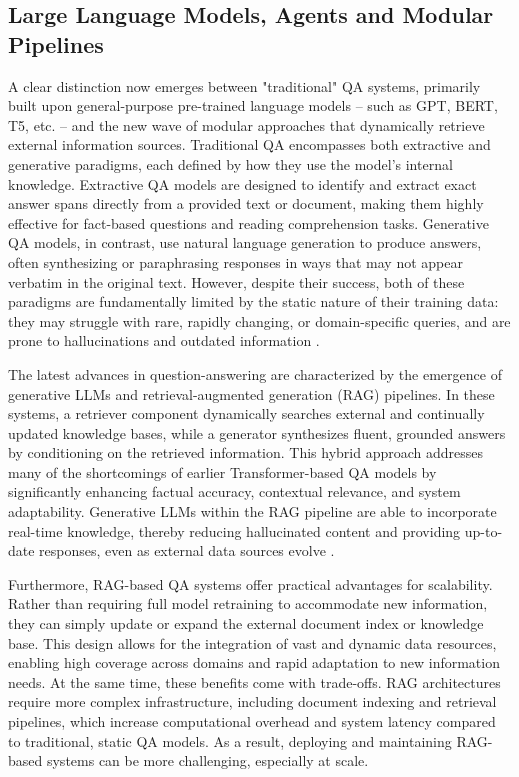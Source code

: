 \begin{spacing}{1.5}
\section{Large Language Models, Agents and Modular Pipelines}
A clear distinction now emerges between "traditional" QA systems, primarily built upon general-purpose pre-trained language models -- such as GPT, BERT, T5, etc. -- and the new wave of modular approaches that dynamically retrieve external information sources. Traditional QA encompasses both extractive and generative paradigms, each defined by how they use the model’s internal knowledge. Extractive QA models are designed to identify and extract exact answer spans directly from a provided text or document, making them highly effective for fact-based questions and reading comprehension tasks. Generative QA models, in contrast, use natural language generation to produce answers, often synthesizing or paraphrasing responses in ways that may not appear verbatim in the original text. However, despite their success, both of these paradigms are fundamentally limited by the static nature of their training data: they may struggle with rare, rapidly changing, or domain-specific queries, and are prone to hallucinations and outdated information \citep{farea_understanding_2025}.

The latest advances in question-answering are characterized by the emergence of generative LLMs and retrieval-augmented generation (RAG) pipelines. In these systems, a retriever component dynamically searches external and continually updated knowledge bases, while a generator synthesizes fluent, grounded answers by conditioning on the retrieved information. This hybrid approach addresses many of the shortcomings of earlier Transformer-based QA models by significantly enhancing factual accuracy, contextual relevance, and system adaptability. Generative LLMs within the RAG pipeline are able to incorporate real-time knowledge, thereby reducing hallucinated content and providing up-to-date responses, even as external data sources evolve \citep{yue_survey_2025,lewis_retrieval-augmented_2020}. 

Furthermore, RAG-based QA systems offer practical advantages for scalability. Rather than requiring full model retraining to accommodate new information, they can simply update or expand the external document index or knowledge base. This design allows for the integration of vast and dynamic data resources, enabling high coverage across domains and rapid adaptation to new information needs. At the same time, these benefits come with trade-offs. RAG architectures require more complex infrastructure, including document indexing and retrieval pipelines, which increase computational overhead and system latency compared to traditional, static QA models. As a result, deploying and maintaining RAG-based systems can be more challenging, especially at scale.


\end{spacing}
